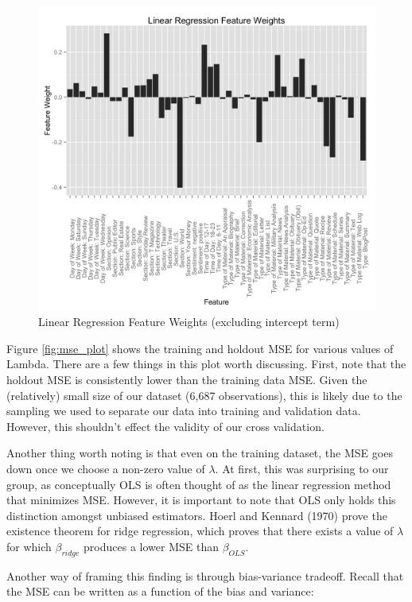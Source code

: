 \documentclass[fleqn,12pt]{SelfArx} %
\begin{document}
\begin{figure}[ht]\centering
\includegraphics[width=\linewidth]{feature_weights_contd.png}
\caption{Linear Regression Feature Weights (excluding intercept term)}
\label{fig:lin_reg_weights}
\end{figure}

Figure \ref{fig:mse_plot} shows the training and holdout MSE for various values of Lambda. There are a few things in this plot worth discussing. First, note that the holdout MSE is consistently lower than the training data MSE. Given the (relatively) small size of our dataset (6,687 observations), this is likely due to the sampling we used to separate our data into training and validation data. However, this shouldn't effect the validity of our cross validation.

Another thing worth noting is that even on the training dataset, the MSE goes down once we choose a non-zero value of $\lambda$. At first, this was surprising to our group, as conceptually OLS is often thought of as the linear regression method that minimizes MSE. However, it is important to note that OLS only holds this distinction amongst unbiased estimators. Hoerl and Kennard (1970) \cite{hoerl1970ridge} prove the existence theorem for ridge regression, which proves that there exists a value of $\lambda$ for which $\beta_{ridge}$ produces a lower MSE than $\beta_{OLS}$. 

Another way of framing this finding is through bias-variance tradeoff. Recall that the MSE can be written as a function of the bias and variance:
\end{document}
